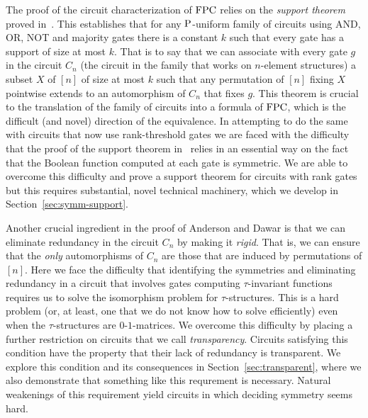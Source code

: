\documentclass[../paper.tex]{subfiles}
\begin{document}
The proof of the circuit characterization of $\text{\upshape FPC}$ relies on the
\emph{support theorem} proved in~\cite{AndersonD17}.  This establishes
that for any $\mathrm{P}$-uniform family of circuits using AND, OR, NOT and
majority gates there is a constant $k$ such that every gate has a
support of size at most $k$.  That is to say that we can associate
with every gate $g$ in the circuit $C_n$ (the circuit in the family
that works on $n$-element structures) a subset $X$ of $[n]$ of size at
most $k$ such that any permutation of $[n]$ fixing $X$ pointwise
extends to an automorphism of $C_n$ that fixes $g$.  This theorem is
crucial to the translation of the family of circuits into a formula of
$\text{\upshape FPC}$, which is the difficult (and novel) direction of the
equivalence.  In attempting to do the same with circuits that now use
rank-threshold gates we are faced with the difficulty that the proof
of the support theorem in~\cite{AndersonD17} relies in an essential
way on the fact that the Boolean function computed at each gate is
symmetric.  We are able to overcome this difficulty and prove a
support theorem for circuits with rank gates but this requires
substantial, novel technical machinery, which we develop in
Section~\ref{sec:symm-support}. 

Another crucial ingredient in the proof of Anderson and Dawar is that
we can eliminate redundancy in the circuit $C_n$ by making it
\emph{rigid}.  That is, we can ensure that the \emph{only}
automorphisms of $C_n$ are those that are induced by permutations of
$[n]$.  Here we face the difficulty that identifying the symmetries
and eliminating redundancy in a circuit that involves gates computing
$\tau$-invariant functions requires us to solve the isomorphism
problem for $\tau$-structures.  This is a hard problem (or, at least,
one that we do not know how to solve efficiently) even when the
$\tau$-structures are $0$-$1$-matrices.  We overcome this difficulty
by placing a further restriction on circuits that we call
\emph{transparency}.  Circuits satisfying this condition have the
property that their lack of redundancy is transparent.  We explore
this condition and its consequences in Section~\ref{sec:transparent},
where we also demonstrate that something like this requrement is
necessary.  Natural weakenings of this requirement yield circuits in
which deciding symmetry seems hard.
\end{document}
